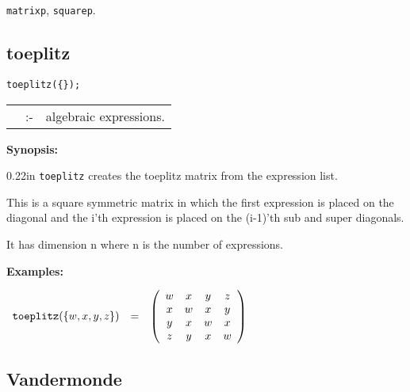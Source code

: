 \hspace*{0.175in} {\tt matrixp}, {\tt squarep}.


\subsection{toeplitz}


\hspace*{0.175in} {\tt toeplitz(\{\exprlist{}\});} \lazyfootnote{}

\hspace*{0.1in}
\begin{tabular}{l l l}
\exprlist{} &:-& algebraic expressions.
\end{tabular}

{\bf Synopsis:} %

\begin{addtolength}{\leftskip}{0.22in}
{\tt toeplitz} creates the toeplitz matrix from the
                expression list.

This is a square symmetric matrix in
                which the first expression is placed on the diagonal
                and the i'th expression is placed on the (i-1)'th sub
                and super diagonals.

It has dimension n where n is the
                number of expressions.

\end{addtolength}

{\bf Examples:}

\begin{flushleft}
\hspace*{0.1in}
\begin{math}
\begin{array}{ccc}
{\tt toeplitz}(\{w,x,y,z\}) & = &
        \left( \begin{array}{cccc} w & x & y & z \\ x & w & x & y \\
      y & x & w & x \\ z & y & x & w
 \end{array} \right)
\end{array}
\end{math}
\end{flushleft}

\subsection{Vandermonde}

